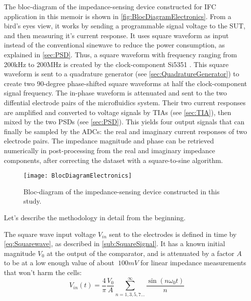 The bloc-diagram of the impedance-sensing device constructed for IFC application in this memoir is shown in \autoref{fig:BlocDiagramElectronics}. From a bird's eyes view, it works by sending a programmable signal voltage to the SUT, and then measuring it's current response. It uses square waveform as input instead of the conventional sinewave to reduce the power consumption, as explained in \autoref{sec:PSD}. Thus, a square waveform with frequency ranging from 200kHz to 200MHz is created by the clock-component Si5351 \cite{si5351datasheet}. This square waveform is sent to a quadrature generator (see \autoref{sec:QuadratureGenerator}) to create two 90-degree phase-shifted square waveforms at half the clock-component signal frequency. The in-phase waveform is attenuated and sent to the two diffential electrode pairs of the microfluidics system. Their two current responses are amplified and converted to voltage signals by TIAs \cite{horowitz1989art} (see \autoref{sec:TIA}), then mixed by the two PSDs (see \autoref{sec:PSD}). This yields four output signals that can finally be sampled by the ADCs: the real and imaginary current responses of two electrode pairs. The impedance magnitude and phase can be retrieved numerically in post-processing from the real and imaginary impedance components, after correcting the dataset with a square-to-sine algorithm. \par
\begin{figure}[h]
    \centering
    \texttt{[image: BlocDiagramElectronics]}
    \caption{Bloc-diagram of the impedance-sensing device constructed in this study.}
    \label{fig:BlocDiagramElectronics}
\end{figure}

Let's describe the methodology in detail from the beginning. \par

The square wave input voltage $V_{in}$ sent to the electrodes is defined in time by \autoref{eq:Squarewave}, as described in \autoref{sub:SquareSignal}. It has a known initial magnitude $V_0$ at the output of the comparator, and is attenuated by a factor $A$ to be at a low enough value of about $~100mV$ for linear impedance measurements that won't harm the cells:
\begin{equation}
   V_{in}(t) = \frac{4}{\pi} \frac{V_0}{A} \displaystyle\sum_{n=1,3,5,7...} ^{\infty} \frac{\sin(n \omega_0 t)}{n}
\end{equation}

